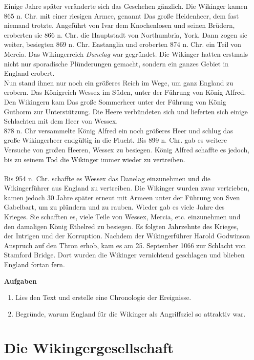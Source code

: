 \documentclass[12pt,a4paper,ngerman,openany]{book}
\newcommand{\aufgaben}[1]{
  \begin{tcolorbox}
    \textbf{Aufgaben}
    \begin{enumerate}
      #1
    \end{enumerate}
  \end{tcolorbox}
} %
\newcommand{\fchapter}[1]{\chapter{#1}\thispagestyle{chapterstyle}}
\begin{document}
Einige Jahre später veränderte sich das Geschehen gänzlich. Die Wikinger kamen 865 n. Chr. mit einer riesigen Armee, genannt \glqq Das große Heidenheer\grqq{}, dem fast niemand trotzte. Angeführt von Ivar dem Knochenlosen und seinen Brüdern, eroberten sie 866 n. Chr. die Hauptstadt von Northumbria, York. Dann zogen sie weiter, besiegten 869 n. Chr. Eastanglia und eroberten 874 n. Chr. ein Teil von Mercia. Das Wikingerreich \textit{Danelag} war gegründet. Die Wikinger hatten erstmals nicht nur sporadische Plünderungen gemacht, sondern ein ganzes Gebiet in England erobert. \\
Nun stand ihnen nur noch ein größeres Reich im Wege, um ganz England zu erobern. Das Königreich Wessex im Süden, unter der Führung von König Alfred. Den Wikingern kam \glqq Das große Sommerheer\grqq{} unter der Führung von König Guthorm zur Unterstützung. Die Heere verbündeten sich und lieferten sich einige Schlachten mit dem Heer von Wessex. \\
878 n. Chr versammelte König Alfred ein noch größeres Heer und schlug das große Wikingerheer endgültig in die Flucht.
Bis 899 n. Chr. gab es weitere Versuche von großen Heeren, Wessex zu besiegen. König Alfred schaffte es jedoch, bis zu seinem Tod die Wikinger immer wieder zu vertreiben.\\\\
Bis 954 n. Chr. schaffte es Wessex das Danelag einzunehmen und die Wikingerführer aus England zu vertreiben. Die Wikinger wurden zwar vertrieben, kamen jedoch 30 Jahre später erneut mit Armeen unter der Führung von Sven Gabelbart, um zu plündern und zu rauben. Wieder gab es viele Jahre des Krieges. Sie schafften es, viele Teile von Wessex, Mercia, etc. einzunehmen und den damaligen König Ethelred zu besiegen. Es folgten Jahrzehnte des Krieges, der Intrigen und der Korruption. Nachdem der Wikingerführer Harold Godwinson Anspruch auf den Thron erhob, kam es am 25. September 1066 zur Schlacht von Stamford Bridge. Dort wurden die Wikinger vernichtend geschlagen und blieben England fortan fern.

\aufgaben{
  \item Lies den Text und erstelle eine Chronologie der Ereignisse.
  \item Begründe, warum England für die Wikinger als Angriffsziel so attraktiv war.
}

\fchapter{Die Wikingergesellschaft}
\end{document}

